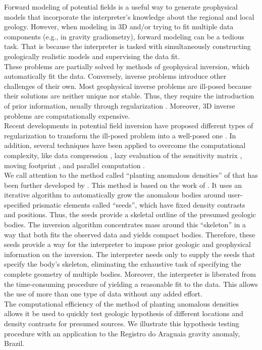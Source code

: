 \documentclass[twocolumn,draft]{svjour3}
\begin{document}
\begin{sloppypar}
Forward modeling of potential fields
is a useful way to generate geophysical models
that incorporate the interpreter's knowledge
about the regional and local geology.
However,
when modeling in 3D
and/or trying to fit multiple data components
(e.g., in gravity gradiometry),
forward modeling can be a tedious task.
That is because the interpreter is
tasked with simultaneously
constructing geologically realistic models
and supervising the data fit.
\\\indent
These problems are partially solved
by methods of geophysical inversion,
which automatically fit the data.
Conversely,
inverse problems introduce other challenges of their own.
Most geophysical inverse problems are ill-posed
because their solutions are neither unique nor stable.
Thus, they require the introduction of prior information,
usually through regularization \citep{silva_potinversion}.
Moreover, 3D inverse problems are computationally expensive.
\\\indent
Recent developments in potential field inversion
have proposed different types of regularization
to transform the ill-posed problem into a well-posed one
\citep[e.g.,][]{last_kubik, li_oldenburg, zhdanov_focusing, silva_interactive,
silvadias_adaptive, martins_tv}.
In addition,
several techniques have been applied
to overcome the computational complexity,
like data compression \citep{zhdanov_compression, li_compression},
lazy evaluation of the sensitivity matrix \citep{uieda_planting},
moving footprint \citep{cox_footprint},
and parallel computation \citep{cuma_largescale}.
\\\indent
We call attention
to the method called ``planting anomalous densities''
of \citet{uieda_planting}
that has been further developed by \citet{uieda_shape}.
This method is based on
the work of \citet{rene}.
It uses an iterative algorithm
to automatically grow the anomalous bodies
around user-specified prismatic elements called ``seeds'',
which have fixed density contrasts and positions.
Thus, the seeds provide
a skeletal outline of the presumed geologic bodies.
The inversion algorithm concentrates mass
around this ``skeleton''
in a way that both
fits the observed data
and yields compact bodies.
Therefore,
these seeds provide
a way for the interpreter
to impose prior geologic and geophysical information
on the inversion.
The interpreter needs only to supply the seeds
that specify the body's skeleton,
eliminating the exhaustive task
of specifying the complete geometry
of multiple bodies.
Moreover,
the interpreter is liberated
from the time-consuming procedure
of yielding a reasonable fit to the data.
This allows the use
of more than one type of data
without any added effort.
\\\indent
The computational efficiency
of the method of planting anomalous densities
allows it be used to quickly test geologic hypothesis
of different locations and density contrasts
for presumed sources.
We illustrate this hypothesis testing procedure
with an application
to the Registro do Araguaia gravity anomaly, Brazil.
\end{sloppypar}
\end{document}
